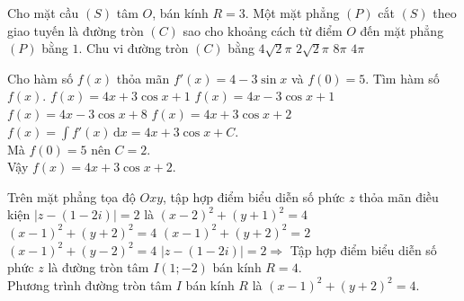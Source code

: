 \begin{ex}%
Cho mặt cầu $(S)$ tâm $O$, bán kính $R=3$. Một mặt phẳng $(P)$ cắt $(S)$ theo giao tuyến là đường tròn $(C)$ sao cho khoảng cách từ điểm $O$ đến mặt phẳng $(P)$ bằng $1$. Chu vi đường tròn $(C)$ bằng
\choice 
{\True $4\sqrt{2}\pi$} 
{$2\sqrt{2}\pi$}
{$8\pi$} 
{$4\pi$}
\loigiai
{
}
\end{ex}

\begin{ex}%
Cho hàm số $f(x)$ thỏa mãn $f'(x)=4-3\sin x$ và $f(0)=5$. Tìm hàm số $f(x)$.
\choice 
{$f(x)=4x+3\cos x+1$} 
{$f(x)=4x-3\cos x+1$}
{$f(x)=4x-3\cos x+8$} 
{\True $f(x)=4x+3\cos x+2$}
\loigiai
{
$f(x)=\displaystyle \int f'(x)\mathrm{\,d}x=4x+3\cos x+C$.\\
Mà $f(0)=5$ nên $C=2$.\\
Vậy $f(x)=4x+3\cos x+2$.
}
\end{ex}

\begin{ex}%
Trên mặt phẳng tọa độ $Oxy$, tập hợp điểm biểu diễn số phức $z$ thỏa mãn điều kiện $\left |z-(1-2i) \right |=2$ là
\choice 
{$(x-2)^2+(y+1)^2=4$} 
{\True $(x-1)^2+(y+2)^2=4$}
{$(x-1)^2+(y+2)^2=2$} 
{$(x-1)^2+(y-2)^2=4$}
\loigiai
{
$\left |z-(1-2i) \right |=2\Rightarrow $ Tập hợp điểm biểu diễn số phức $z$ là đường tròn tâm $I(1;-2)$ bán kính $R=4$.\\
Phương trình đường tròn tâm $I$ bán kính $R$ là $(x-1)^2+(y+2)^2=4$.
}
\end{ex}

